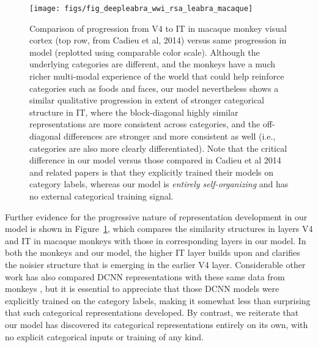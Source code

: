 \documentclass[12pt,twoside]{article}
\newif\myifpdf
\begin{document}
\begin{figure}
  \centering\texttt{[image: figs/fig\_deepleabra\_wwi\_rsa\_leabra\_macaque]}
  \caption{\small Comparison of progression from V4 to IT in macaque monkey visual cortex (top row, from Cadieu et al, 2014) versus same progression in model (replotted using comparable color scale).  Although the underlying categories are different, and the monkeys have a much richer multi-modal experience of the world that could help reinforce categories such as foods and faces, our model nevertheless shows a similar qualitative progression in extent of stronger categorical structure in IT, where the block-diagonal highly similar representations are more consistent across categories, and the off-diagonal differences are stronger and more consistent as well (i.e., categories are also more clearly differentiated).  Note that the critical difference in our model versus those compared in Cadieu et al 2014 and related papers is that they explicitly trained their models on category labels, whereas our model is {\em entirely self-organizing} and has no external categorical training signal.}
  \label{fig.macaque}
\end{figure}


Further evidence for the progressive nature of representation development in our model is shown in Figure~\ref{fig.macaque}, which compares the similarity structures in layers V4 and IT in macaque monkeys \cite{CadieuHongYaminsEtAl14} with those in corresponding layers in our model.  In both the monkeys and our model, the higher IT layer builds upon and clarifies the noisier structure that is emerging in the earlier V4 layer.  Considerable other work has also compared DCNN representations with these same data from monkeys \cite{CadieuHongYaminsEtAl14}, but it is essential to appreciate that those DCNN models were explicitly trained on the category labels, making it somewhat less than surprising that such categorical representations developed.  By contrast, we reiterate that our model has discovered its categorical representations entirely on its own, with no explicit categorical inputs or training of any kind.
\end{document}
